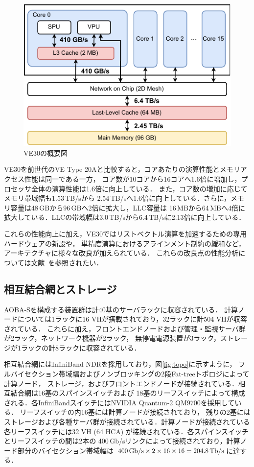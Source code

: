 ﻿\documentclass[submit,techrep,noauthor]{ipsj}
\begin{document}
\begin{figure}[tb]
  \centering
  \includegraphics{figs/ve30_memory_hierarchy.pdf}
  \caption{VE30の概要図~\cite{Takahashi2023}}\label{fig:ve30}
\end{figure}

VE30を前世代のVE Type 20Aと比較すると，コアあたりの演算性能とメモリアクセス性能は同一である一方，
コア数が10コアから16コアへ1.6倍に増加し，プロセッサ全体の演算性能は1.6倍に向上している．
また，コア数の増加に応じてメモリ帯域幅も1.53\,TB/sから
2.54\,TB/sへ1.6倍に向上している．さらに，メモリ容量は48\,GBから96\,GBへ2倍に拡大し，LLC容量は
16\,MBから64\,MBへ4倍に拡大している．LLCの帯域幅は3.0\,TB/sから6.4\,TB/sに2.13倍に向上している．

これらの性能向上に加え，VE30ではリストベクトル演算を加速するための専用ハードウェアの新設や，
単精度演算におけるアラインメント制約の緩和など，アーキテクチャに様々な改良が加えられている．
これらの改良点の性能分析については文献~\cite{Takahashi2023}を参照されたい．

\subsection{相互結合網とストレージ}

AOBA-Sを構成する装置群は計40基のサーバラックに収容されている．
計算ノードについては1ラックに16 VHが搭載されており，32ラックに計504 VHが収容されている．
これらに加え，フロントエンドノードおよび管理・監視サーバ群が2ラック，ネットワーク機器が2ラック，
無停電電源装置が3ラック，ストレージが1ラックの計8ラックに収容されている．

相互結合網にはInfiniBand NDRを採用しており，図\ref{fig:topo}に示すように，
フルバイセクション帯域幅およびノンブロッキングの2段Fat-treeトポロジによって計算ノード，
ストレージ，およびフロントエンドノードが接続されている．相互結合網は16基のスパインスイッチおよび
18基のリーフスイッチによって構成される．各InfiniBandスイッチにはNVIDIA Quantum-2 QM9700を採用している．
リーフスイッチの内16基には計算ノードが接続されており，
残りの2基にはストレージおよび各種サーバ群が接続されている．計算ノードが接続されている
各リーフスイッチには32 VH (64 HCA) が接続されている．各スパインスイッチとリーフスイッチの間は2本の
400\,Gb/sリンクによって接続されており，計算ノード部分のバイセクション帯域幅は
$400\text{\,Gb/s} \times 2 \times 16 \times 16 = 204.8\text{\,Tb/s}$に達する．
\end{document}
